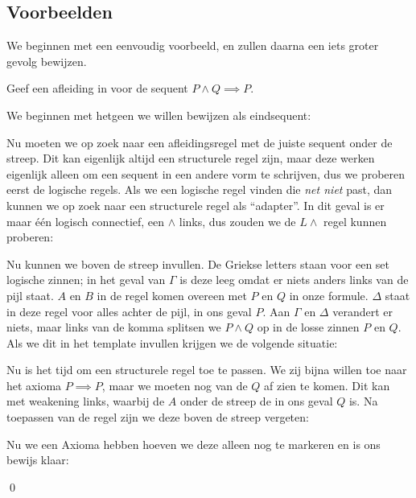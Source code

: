 \subsection{Voorbeelden}
We beginnen met een eenvoudig voorbeeld, en zullen daarna een iets groter gevolg bewijzen.

\begin{example}\label{ex:lk:helloworld}
Geef een afleiding in \lk{} voor de sequent $P \land Q \implies P$.

We beginnen met hetgeen we willen bewijzen als eindsequent:

\begin{prooftree}
\end{prooftree}

Nu moeten we op zoek naar een afleidingsregel met de juiste sequent onder de streep. Dit kan eigenlijk altijd een structurele regel zijn, maar deze werken eigenlijk alleen om een sequent in een andere vorm te schrijven, dus we proberen eerst de logische regels. Als we een logische regel vinden die \emph{net niet} past, dan kunnen we op zoek naar een structurele regel als \enquote{adapter}. In dit geval is er maar \'e\'en logisch connectief, een $\land$ links, dus zouden we de $L\land$ regel kunnen proberen:

\begin{prooftree}
\end{prooftree}

Nu kunnen we boven de streep invullen. De Griekse letters staan voor een set logische zinnen; in het geval van $\Gamma$ is deze leeg omdat er niets anders links van de pijl staat. $A$ en $B$ in de regel komen overeen met $P$ en $Q$ in onze formule. $\Delta$ staat in deze regel voor alles achter de pijl, in ons geval $P$. Aan $\Gamma$ en $\Delta$ verandert er niets, maar links van de komma splitsen we $P \land Q$ op in de losse zinnen $P$ en $Q$. Als we dit in het template invullen krijgen we de volgende situatie:

\begin{prooftree}
\end{prooftree}

Nu is het tijd om een structurele regel toe te passen. We zij bijna willen toe naar het axioma $P \implies P$, maar we moeten nog van de $Q$ af zien te komen. Dit kan met weakening links, waarbij de $A$ onder de streep de in ons geval $Q$ is. Na toepassen van de regel zijn we deze boven de streep vergeten:

\begin{prooftree}
\end{prooftree}

Nu we een Axioma hebben hoeven we deze alleen nog te markeren en is ons bewijs klaar:

\begin{prooftree}
\end{prooftree}
\hfill\qed

\end{example}

